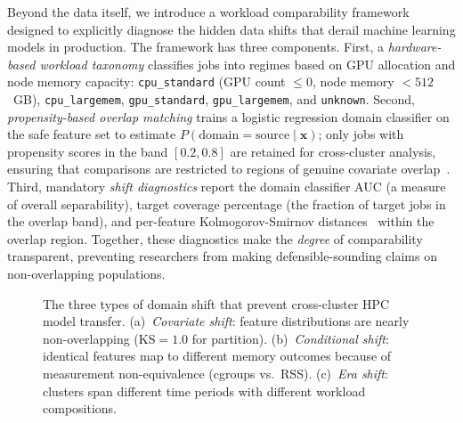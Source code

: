 \documentclass[sigconf]{acmart}
\begin{document}
Beyond the data itself, we introduce a workload comparability framework designed to explicitly diagnose the hidden data shifts that derail machine learning models in production.
The framework has three components.
First, a \emph{hardware-based workload taxonomy} classifies jobs into regimes based on GPU allocation and node memory capacity: \texttt{cpu\_standard} (GPU count $\leq 0$, node memory $< 512$~GB), \texttt{cpu\_largemem}, \texttt{gpu\_standard}, \texttt{gpu\_largemem}, and \texttt{unknown}.
Second, \emph{propensity-based overlap matching} trains a logistic regression domain classifier on the safe feature set to estimate $P(\text{domain} = \text{source} \mid \mathbf{x})$; only jobs with propensity scores in the band $[0.2, 0.8]$ are retained for cross-cluster analysis, ensuring that comparisons are restricted to regions of genuine covariate overlap~\cite{domain_adaptation_survey_2021}.
Third, mandatory \emph{shift diagnostics} report the domain classifier AUC (a measure of overall separability), target coverage percentage (the fraction of target jobs in the overlap band), and per-feature Kolmogorov-Smirnov distances~\cite{massey1951kolmogorov} within the overlap region.
Together, these diagnostics make the \emph{degree} of comparability transparent, preventing researchers from making defensible-sounding claims on non-overlapping populations.

\begin{figure}[t]
\centering
\caption{The three types of domain shift that prevent cross-cluster HPC model transfer. (a)~\emph{Covariate shift}: feature distributions are nearly non-overlapping ($\text{KS} = 1.0$ for partition). (b)~\emph{Conditional shift}: identical features map to different memory outcomes because of measurement non-equivalence (cgroups vs.\ RSS). (c)~\emph{Era shift}: clusters span different time periods with different workload compositions.}
\label{fig:domain-shifts}
\end{figure}
\end{document}
